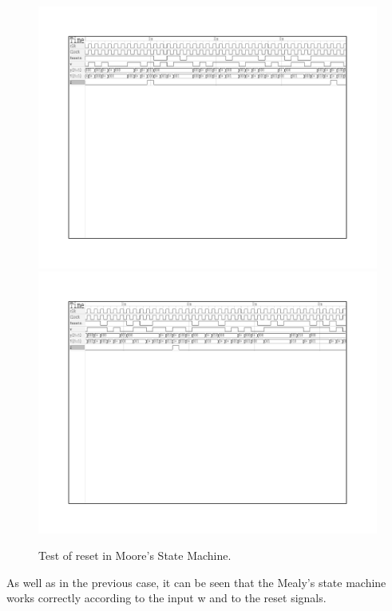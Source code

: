 \begin{figure}[H]
\centering
\includegraphics[scale=0.9]{../Exercise2/Mealy/gtkr1}
\includegraphics[scale=0.9]{../Exercise2/Mealy/gtkr2}
\caption{\color{cyan}Test of reset in Moore's State Machine.}
\label{gtkrr}
\end{figure}

As well as in the previous case, it can be seen that the Mealy's state machine works correctly according to the input w and to the reset signals. 

